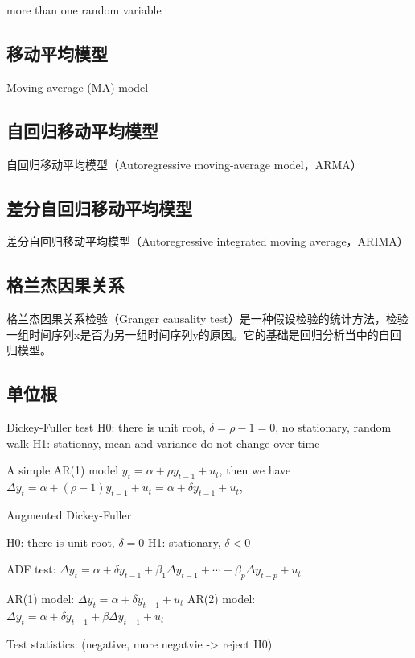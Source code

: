 \documentclass[11pt]{article}
\begin{document}
more than one random variable


\subsection{移动平均模型}
Moving-average (MA) model


\subsection{自回归移动平均模型}

自回归移动平均模型（Autoregressive moving-average model，ARMA）

\subsection{差分自回归移动平均模型}

差分自回归移动平均模型（Autoregressive integrated moving average，ARIMA）


\subsection{格兰杰因果关系}

格兰杰因果关系检验（Granger causality test）是一种假设检验的统计方法，检验一组时间序列x是否为另一组时间序列y的原因。它的基础是回归分析当中的自回归模型。


\subsection{单位根}

Dickey-Fuller test
H0: there is unit root, $\delta = \rho - 1 =0$, no stationary, random walk
H1: stationay, mean and variance do not change over time

A simple AR(1) model $y_t = \alpha + \rho y_{t-1} + u_t$, then we have $\Delta y_t = \alpha + (\rho -1) y_{t-1} + u_t = \alpha + \delta y_{t-1} + u_t$, 

Augmented Dickey-Fuller 

H0: there is unit root, $\delta = 0$
H1: stationary, $\delta < 0$

ADF test: $\Delta y_t = \alpha + \delta y_{t-1} + \beta_1 \Delta y_{t-1} + \cdots + \beta_{p} \Delta y_{t-p} + u_t$

AR(1) model: $\Delta y_t = \alpha + \delta y_{t-1} + u_t$
AR(2) model: $\Delta y_t = \alpha + \delta y_{t-1} + \beta \Delta y_{t-1} + u_t$

Test statistics: (negative, more negatvie -> reject H0)
\end{document}
